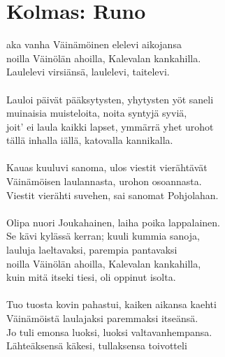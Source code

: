 
\chapter*{Kolmas: Runo}

aka vanha Väinämöinen elelevi aikojansa           \\
noilla Väinölän ahoilla, Kalevalan kankahilla.                \\
Laulelevi virsiänsä, laulelevi, taitelevi.                    \\
                                                              \\
Lauloi päivät pääksytysten, yhytysten yöt saneli              \\
muinaisia muisteloita, noita syntyjä syviä,                   \\
joit' ei laula kaikki lapset, ymmärrä yhet urohot             \\
tällä inhalla iällä, katovalla kannikalla.                    \\
                                                              \\
Kauas kuuluvi sanoma, ulos viestit vierähtävät                \\
Väinämöisen laulannasta, urohon osoannasta.                   \\
Viestit vierähti suvehen, sai sanomat Pohjolahan.             \\
                                                              \\
Olipa nuori Joukahainen, laiha poika lappalainen.             \\
Se kävi kylässä kerran; kuuli kummia sanoja,                  \\
lauluja laeltavaksi, parempia pantavaksi                      \\
noilla Väinölän ahoilla, Kalevalan kankahilla,                \\
kuin mitä itseki tiesi, oli oppinut isolta.                   \\
                                                              \\
Tuo tuosta kovin pahastui, kaiken aikansa kaehti              \\
Väinämöistä laulajaksi paremmaksi itseänsä.                   \\
Jo tuli emonsa luoksi, luoksi valtavanhempansa.               \\
Lähteäksensä käkesi, tullaksensa toivotteli                   \\
